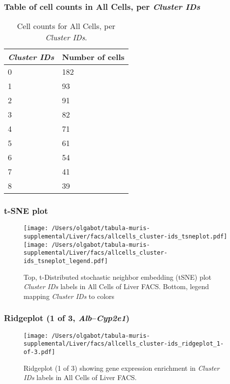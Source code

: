 \subsubsection{Table of cell counts in All Cells, per \emph{Cluster IDs}}\begin{table}[h]
\centering
\label{my-label}
\begin{tabular}{@{}ll@{}}
\toprule

\emph{Cluster IDs}& Number of cells \\ \midrule
0 & 182 \\

1 & 93 \\

2 & 91 \\

3 & 82 \\

4 & 71 \\

5 & 61 \\

6 & 54 \\

7 & 41 \\

8 & 39 \\
\bottomrule
\end{tabular}
\caption{Cell counts for All Cells, per \emph{Cluster IDs}.}
\end{table}

\clearpage
\subsubsection{t-SNE plot}
\begin{figure}[h]
\centering
\texttt{[image: /Users/olgabot/tabula-muris-supplemental/Liver/facs/allcells\_cluster-ids\_tsneplot.pdf]}
\texttt{[image: /Users/olgabot/tabula-muris-supplemental/Liver/facs/allcells\_cluster-ids\_tsneplot\_legend.pdf]}
\caption{Top, t-Distributed stochastic neighbor embedding (tSNE) plot  \emph{Cluster IDs} labels in All Cells of Liver FACS. Bottom, legend mapping \emph{Cluster IDs} to colors}
\end{figure}


\clearpage

\subsubsection{Ridgeplot (1 of 3, \emph{Alb}--\emph{Cyp2e1})}
\begin{figure}[h]
\centering
\texttt{[image: /Users/olgabot/tabula-muris-supplemental/Liver/facs/allcells\_cluster-ids\_ridgeplot\_1-of-3.pdf]}

\caption{ Ridgeplot (1 of 3)  showing gene expression enrichment in \emph{Cluster IDs} labels in All Cells of Liver FACS. }
\end{figure}


